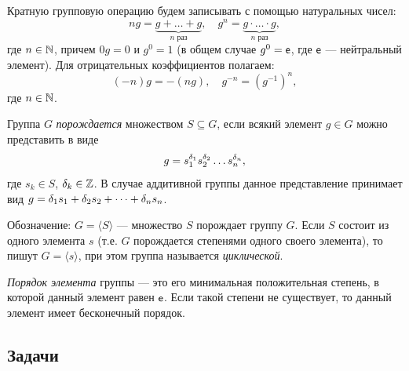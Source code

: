 Кратную групповую операцию будем записывать с помощью натуральных чисел:
$$
ng = \underbrace{g+\dots+g}_{n\mbox{ раз}},\quad g^n = \underbrace{g\cdot\dots\cdot g}_{n\mbox{ раз}},
$$
где $n\in\mathbb N$, причем $0g=0$ и $g^0=1$ (в общем случае $g^0=\mathsf e$, где $\mathsf e$ --- нейтральный элемент). Для отрицательных коэффициентов полагаем:
$$
(-n)g = -(ng),\quad g^{-n} = (g^{-1})^n,
$$
где $n\in\mathbb N$.

Группа $G$ \textit{порождается} множеством $S\subseteq G$, если всякий элемент $g\in G$ можно представить в виде
$$
g = s_1^{\delta_1}s_2^{\delta_2}\dots s_n^{\delta_n},
$$
где $s_k\in S$, $\delta_k\in\mathbb Z$. В случае аддитивной группы данное представление принимает вид
$g = \delta_1s_1+\delta_2s_2+\dots+\delta_ns_n$.

Обозначение: $G=\langle S\rangle$ --- множество $S$ порождает группу $G$. Если $S$ состоит из одного элемента $s$ (т.е. $G$ порождается степенями одного своего элемента), то пишут $G=\langle s\rangle$, при этом группа называется \textit{циклической}.

\textit{Порядок элемента} группы --- это его минимальная положительная степень, в которой данный элемент равен $\mathsf e$. Если такой степени не существует, то данный элемент имеет бесконечный порядок.



\subsection*{Задачи}

